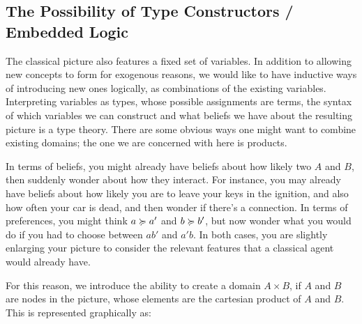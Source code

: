 \documentclass{article}
\begin{document}
	\subsection{The Possibility of Type Constructors / Embedded Logic}\label{sec:belief-typing}
	The classical picture also features a fixed set of variables. In addition to allowing new concepts to form for exogenous reasons, we would like to have inductive ways of introducing new ones logically, as combinations of the existing variables. Interpreting variables as types, whose possible assignments are terms, the syntax of which variables we can construct and what beliefs we have about the resulting picture is a type theory. There are some obvious ways one might want to combine existing domains; the one we are concerned with here is products.
	
	In terms of beliefs, you might already have beliefs about how likely two  $A$ and $B$, then suddenly wonder about how they interact. For instance, you may already have beliefs about how likely you are to leave your keys in the ignition, and also how often your car is dead, and then wonder if there's a connection. 
	In terms of preferences, you might think $a \succcurlyeq a'$ and $b \succcurlyeq b'$, but now wonder what you would do if you had to choose between $a b'$ and $a' b$. In both cases, you are slightly enlarging your picture to consider the relevant features that a classical agent would already have.
	
	For this reason, we introduce the ability to create a domain $A \times B$, if $A$ and $B$ are nodes in the picture, whose elements are the cartesian product of $A$ and $B$. %
	This is represented graphically as:
	\begin{center}
	\end{center}
	
	
\end{document}
